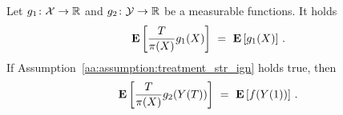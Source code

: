 \begin{lemma}
  \label{ps_weights_lemma}
  Let
  $
  g_1\colon
  \mathcal{X}\to\mathbb{R}
  $
  and
  $
  g_2\colon
  \mathcal{Y}\to\mathbb{R}
  $
  be a measurable functions.
  It holds
  \begin{gather*}
    \E
    \left[
    \frac{T}{\pi(X)}
    g_1(X)
    \right]
    \ 
    =
    \ 
    \E
    \left[
    g_1(X)
    \right]
    \,.
  \end{gather*}
  If Assumption~\ref{aa:assumption:treatment_str_ign} holds true, then
  \begin{gather*}
    \E
    \left[
    \frac{T}{\pi(X)}
    g_2(Y(T))
    \right]
    \ 
    =
    \ 
    \E
    \left[
    f(Y(1))
    \right]
    \,.
  \end{gather*}
\end{lemma}

